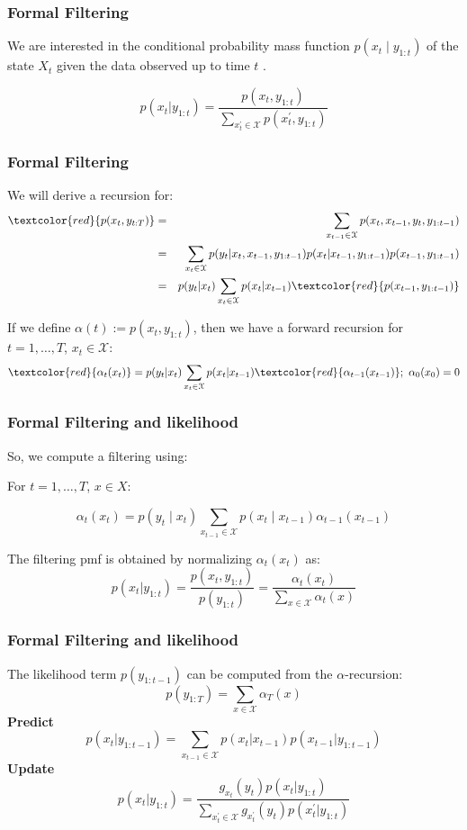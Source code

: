 \documentclass[xcolor=dvipsnames, compress]{beamer}
\begin{document}
\begin{frame}
\frametitle{Formal Filtering}
We are interested in the conditional probability mass function $p\left(x_{t}\mid y_{1:t}\right)$ of the state $X_{t}$ given the data observed up to time $t$ .

$$ p(x_t|y_{1:t}) = \frac{p(x_t, y_{1:t})}{ \sum_{x_t^\prime \in \mathcal{X}} p(x_t^\prime, y_{1:t}) }$$

\end{frame}
%
\begin{frame}
\frametitle{Formal Filtering}
We will derive a recursion for:
\hspace{-0.2cm}
\begin{eqnarray*}
\textcolor{red}{p(x_t,y_{t	:T})} & = & \sum_{x_{t-1} \in \mathcal{X}} p(x_t, x_{t-1}, y_t, y_{1:t-1})\\
& = & \sum_{x_t \in \mathcal{X}} p(y_{t}| x_t, x_{t-1}, y_{1:t-1} ) p(x_{t} |x_{t-1},y_{1:t-1}) p(x_{t-1},y_{1:t-1}) \\
& = &  p(y_{t}|x_t) \sum_{x_t \in \mathcal{X}} p(x_{t}|x_{t-1}) \textcolor{red}{ p(x_{t-1},y_{1:t-1})}   
\end{eqnarray*}

If we define $\alpha(t):= p(x_{t},y_{1:t})$, then we have a forward recursion for $t=1, \ldots, T$, $x_t\in \mathcal{X}$:
$$ \textcolor{red}{\alpha_{t}(x_{t})} = p(y_{t}|x_t) \sum_{x_t \in \mathcal{X}} p(x_{t}|x_{t-1}) \textcolor{red}{\alpha_{t-1}(x_{t-1})}; \mbox{ } \alpha_0(x_0)=0 $$
\end{frame}
%
\begin{frame}
\frametitle{Formal Filtering and likelihood}
So, we compute a filtering using: 

For $t=1,\ldots,T$, $x\in X$:

\[
\alpha_{t}\left(x_{t}\right)=p\left(y_{t}\mid x_{t}\right)\sum_{x_{t-1}\in\mathcal{{X}}}p\left(x_{t}\mid x_{t-1}\right)\alpha_{t-1}\left(x_{t-1}\right)
\]	

The filtering pmf is obtained by normalizing $\alpha_{t}\left(x_{t}\right)$
as: 
$$p(x_t| y_{1:t}) = \frac{p(x_t, y_{1:t})}{p(y_{1:t})}  = \frac{\alpha_t(x_t)}{ \sum_{x \in \mathcal{X}} \alpha_t(x) }$$
\end{frame}
%
\begin{frame}
\frametitle{Formal Filtering and likelihood}


The likelihood term $p\left(y_{1:t-1}\right)$ can be computed from
the $\alpha$-recursion:
$$p(y_{1:T}) =  \sum_{x \in \mathcal{X}} \alpha_T(x) $$
\textbf{Predict}
$$p(x_t| y_{1:t-1}) = \sum_{x_{t-1} \in \mathcal{X}} p(x_t|x_{t-1}) p(x_{t-1}|y_{1:t-1}) $$
\textbf{Update}
$$p(x_t| y_{1:t}) = \frac{g_{x_t}(y_t) p(x_t|y_{1:t})}{\sum_{x_{t}^\prime \in \mathcal{X}} g_{x_t^\prime}(y_t) p(x_t^\prime|y_{1:t})} $$
\end{frame}
\end{document}
